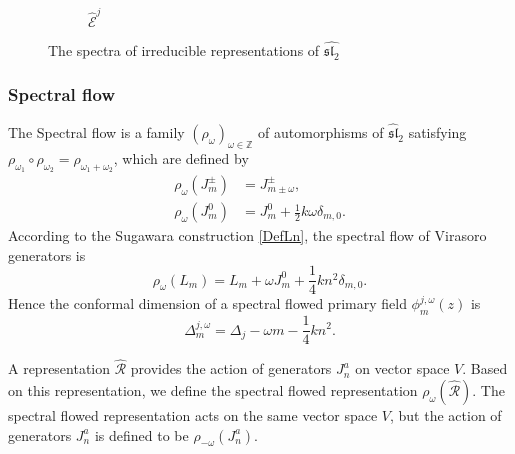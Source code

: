 \documentclass[10pt,a4paper]{article}
\numberwithin{equation}{section}
\begin{document}
\begin{figure}[htbp]
\begin{subfigure}[b]{0.48\textwidth}
        \caption{$\widehat{\mathcal{E}}^{j}$}
        \label{fig:E}
    \end{subfigure}

    \caption{The spectra of irreducible representations of $\widehat{\mathfrak{sl}_{2}}$}
    \label{fig:irrep}
\end{figure}

\subsubsection*{Spectral flow}
The Spectral flow is a family $(\rho_{\omega})_{\omega \in \mathbb{Z}}$ of automorphisms of $\widehat{\mathfrak{sl}}_{2}$
satisfying $\rho_{\omega_{1}} \circ \rho_{\omega_{2}}  = \rho_{\omega_{1} + \omega_{2}}$, which are defined by 
\begin{equation}
    \begin{aligned}
        \rho_{\omega}(J^{\pm}_{m}) & = J^{\pm}_{m \pm \omega},\\
        \rho_{\omega}(J^{0}_{m}) & = J^{0}_{m} + \frac{1}{2} k \omega \delta_{m,0}.
    \end{aligned}
\end{equation}
According to the Sugawara construction \ref{DefLn}, the spectral flow of Virasoro generators is 
\begin{equation}
    \rho_{\omega}(L_{m}) = L_{m} + \omega J^{0}_{m} + \frac{1}{4} k n^{2} \delta_{m,0}.
\end{equation}
Hence the conformal dimension of a spectral flowed primary field $\phi^{j,\omega}_{m}(z)$ is 
\begin{equation}
    \Delta^{j,\omega}_{m} = \Delta_{j} - \omega m - \frac{1}{4} k n^{2}. \label{SpecFlowConDim}
\end{equation}

A representation $\widehat{\mathcal{R}} $ provides the action of generators $J^{a}_{n}$ on vector space $V$. Based on this representation, 
we define the spectral flowed representation $\rho_{\omega}\left(\hat{\mathcal{R}}\right)$. The spectral flowed representation acts on the 
same vector space $V$, but the action of generators $J^{a}_{n}$ is defined to be $\rho_{-\omega}\left(J^{a}_{n}\right)$. 
\end{document}
